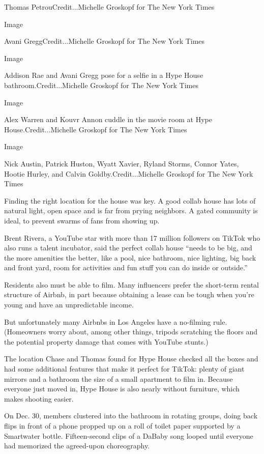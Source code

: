 Thomas PetrouCredit...Michelle Groskopf for The New York Times

Image

Avani GreggCredit...Michelle Groskopf for The New York Times

Image

Addison Rae and Avani Gregg pose for a selfie in a Hype House
bathroom.Credit...Michelle Groskopf for The New York Times

Image

Alex Warren and Kouvr Annon cuddle in the movie room at Hype
House.Credit...Michelle Groskopf for The New York Times

Image

Nick Austin, Patrick Huston, Wyatt Xavier, Ryland Storms, Connor Yates,
Hootie Hurley, and Calvin Goldby.Credit...Michelle Groskopf for The New
York Times

Finding the right location for the house was key. A good collab house
has lots of natural light, open space and is far from prying neighbors.
A gated community is ideal, to prevent swarms of fans from showing up.

Brent Rivera, a YouTube star with more than 17 million followers on
TikTok who also runs a talent incubator, said the perfect collab house
``needs to be big, and the more amenities the better, like a pool, nice
bathroom, nice lighting, big back and front yard, room for activities
and fun stuff you can do inside or outside.''

Residents also must be able to film. Many influencers prefer the
short-term rental structure of Airbnb, in part because obtaining a lease
can be tough when you're young and have an unpredictable income.

But unfortunately many Airbnbs in Los Angeles have a no-filming rule.
(Homeowners worry about, among other things, tripods scratching the
floors and the potential property damage that comes with YouTube
stunts.)

The location Chase and Thomas found for Hype House checked all the boxes
and had some additional features that make it perfect for TikTok: plenty
of giant mirrors and a bathroom the size of a small apartment to film
in. Because everyone just moved in, Hype House is also nearly without
furniture, which makes shooting easier.

On Dec. 30, members clustered into the bathroom in rotating groups,
doing back flips in front of a phone propped up on a roll of toilet
paper supported by a Smartwater bottle. Fifteen-second clips of a DaBaby
song looped until everyone had memorized the agreed-upon choreography.

